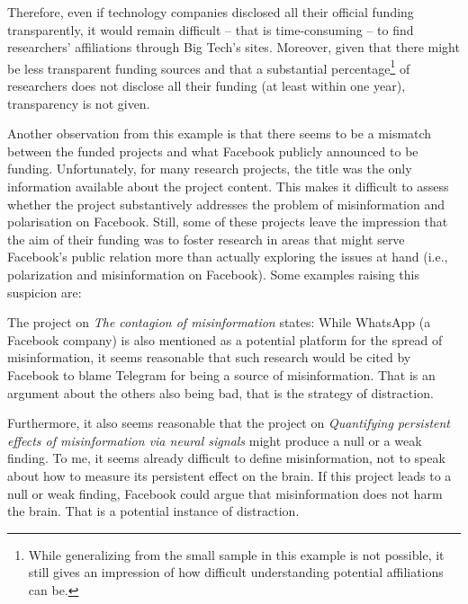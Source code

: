 Therefore, even if technology companies disclosed all their official funding transparently, it would remain difficult -- that is time-consuming -- to find researchers' affiliations through Big Tech's sites.
Moreover, given that there might be less transparent funding sources and that a substantial percentage\footnote{While generalizing from the small sample in this example is not possible, it still gives an impression of how difficult understanding potential affiliations can be.} of researchers does not disclose all their funding (at least within one year), transparency is not given.

Another observation from this example is that there seems to be a mismatch between the funded projects and what Facebook publicly announced to be funding.
Unfortunately, for many research projects, the title was the only information available about the project content. 
This makes it difficult to assess whether the project substantively addresses the problem of misinformation and polarisation on Facebook.
Still, some of these projects leave the impression that the aim of their funding was to foster research in areas that might serve Facebook's public relation more than actually exploring the issues at hand (i.e., polarization and misinformation on Facebook).
Some examples raising this suspicion are:

The project on \emph{The contagion of misinformation} states:  While WhatsApp (a Facebook company) is also mentioned as a potential platform for the spread of misinformation, it seems reasonable that such research would be cited by Facebook to blame Telegram for being a source of misinformation. 
That is an argument about the others also being bad, that is the strategy of distraction. 

Furthermore, it also seems reasonable that the project on \emph{Quantifying persistent effects of misinformation via neural signals} might produce a null or a weak finding. 
To me, it seems already difficult to define misinformation, not to speak about how to measure its persistent effect on the brain. 
If this project leads to a null or weak finding, Facebook could argue that misinformation does not harm the brain. That is a potential instance of distraction.


